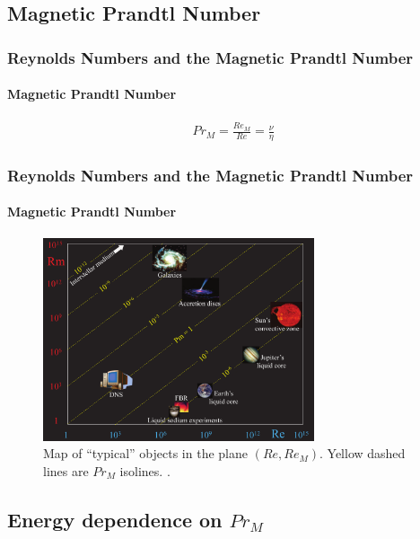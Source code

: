 \documentclass{beamer}
\begin{document}
\subsection{Magnetic Prandtl Number}

\begin{frame}
 \frametitle{Reynolds Numbers and the Magnetic Prandtl Number}
 \framesubtitle{Magnetic Prandtl Number}
 
  \begin{align}
  Pr_M = \frac{Re_M}{Re} =  \frac{\nu}{\eta} \nonumber
 \end{align}
 
\end{frame}

\begin{frame}
 \frametitle{Reynolds Numbers and the Magnetic Prandtl Number}
 \framesubtitle{Magnetic Prandtl Number}
 
 \begin{figure}[t]
  \includegraphics[width=8cm]{img/PrM_spectrum}
  \caption{Map of ``typical'' objects in the plane $(Re,Re_M)$. Yellow dashed lines are $Pr_M$ isolines. \cite{plunian2013shell}.}
  \centering
 \end{figure}
 
 
 
 
 
\end{frame}

\subsection{Energy dependence on $Pr_M$}
\end{document}
